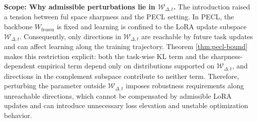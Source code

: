 \documentclass{article}
\theoremstyle{plain}
\theoremstyle{definition}
\theoremstyle{remark}
\begin{document}


\vspace{-1pt}
\noindent\textbf{Scope: Why admissible perturbations lie in $\mathcal W_{\Delta,t}$.}\quad
The introduction raised a tension between ful space sharpness and the PECL setting.
In PECL, the backbone $W_{\mathrm{frozen}}$ is fixed and learning is confined to the LoRA update subspace $\mathcal W_{\Delta,t}$. Consequently, only directions in $\mathcal W_{\Delta,t}$ are reachable by future task updates and can affect learning along the training trajectory.
Theorem \ref{thm:pecl-bound} makes this restriction explicit: both the task-wise KL term and the sharpness-dependent empirical term depend only on distributions supported on $\mathcal W_{\Delta,t}$, and directions in the complement subspace contribute to neither term.
Therefore, perturbing the parameter outside $\mathcal W_{\Delta,t}$ imposes robustness requirements along unreachable directions, which cannot be compensated by admissible LoRA updates and can introduce unnecessary loss elevation and unstable optimization behavior.
\end{document}
